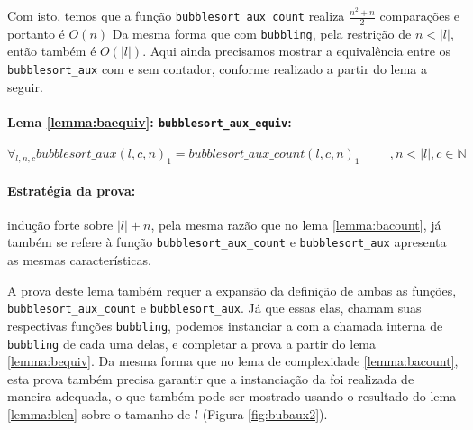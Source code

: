 Com isto, temos que a função \texttt{bubblesort\_aux\_count} realiza
$\frac{n^2 + n}{2}$ comparações e portanto é $O(n)$
Da mesma forma que com \texttt{bubbling}, pela restrição de $n<|l|$,
então também é $O(|l|)$. Aqui ainda precisamos mostrar a equivalência
entre os \texttt{bubblesort\_aux} com e sem contador, conforme realizado
a partir do lema a seguir.

\paragraph{Lema \ref{lemma:baequiv}: \texttt{bubblesort\_aux\_equiv}:}
\begin{equation*}
    \forall_{l,n,c} bubblesort\_aux(l, c, n)_1 = bubblesort\_aux\_count(l, c, n)_1    \hspace{1cm}, n<|l|, c\in \mathbb{N}
\end{equation*}

\paragraph{Estratégia da prova:} indução forte sobre $|l| + n$, pela mesma
razão que no lema \ref{lemma:bacount}, já também se refere à função
\texttt{bubblesort\_aux\_count} e \texttt{bubblesort\_aux} apresenta
as mesmas características.

A prova deste lema também requer a expansão da definição de ambas as
funções, \texttt{bubblesort\_aux\_count} e \texttt{bubblesort\_aux}.
Já que essas elas, chamam suas respectivas funções \texttt{bubbling},
podemos instanciar a \HI com a chamada interna de \texttt{bubbling}
de cada uma delas, e completar a prova a partir do lema \ref{lemma:bequiv}.
Da mesma forma que no lema de complexidade \ref{lemma:bacount}, esta
prova também precisa garantir que a instanciação da \HI foi realizada
de maneira adequada, o que também pode ser mostrado usando o resultado
do lema \ref{lemma:blen} sobre o tamanho de $l$ (Figura \ref{fig:bubaux2}).


